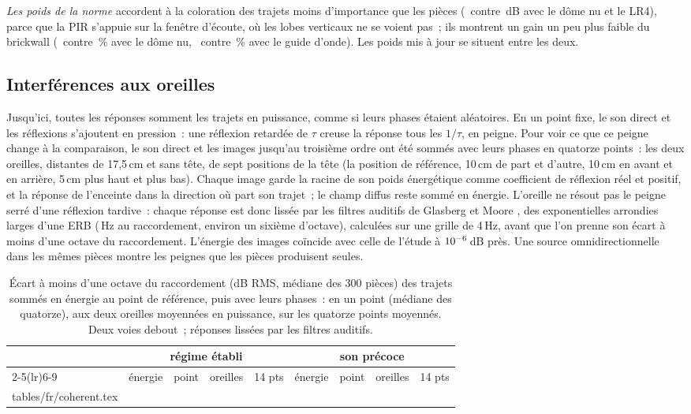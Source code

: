 \documentclass[11pt,a4paper]{article}
\makeatletter
\newcommand{\rows}[1]{\@@input tables/fr/#1.tex }
\makeatother
\begin{document}
\emph{Les poids de la norme} accordent à la coloration des trajets moins d'importance que les pièces
(\ncolDomeLrFourPir\ contre \ncolDomeLrFourSteady\,dB avec le dôme nu et le LR4), parce que la PIR
s'appuie sur la fenêtre d'écoute, où les lobes verticaux ne se voient pas~; ils montrent un gain un peu
plus faible du brickwall (\ncolDomeRedPir\ contre \ncolDomeRedSteady\,\% avec le dôme nu, \ncolWgRedPir\
contre \ncolWgRedSteady\,\% avec le guide d'onde). Les poids mis à jour se situent entre les deux.

\clearpage
\subsection{Interférences aux oreilles}
\label{sec:interference}

Jusqu'ici, toutes les réponses somment les trajets en puissance, comme si leurs phases étaient
aléatoires. En un
point fixe, le son direct et les réflexions s'ajoutent en pression~: une réflexion retardée de $\tau$
creuse la réponse tous les $1/\tau$, en peigne. Pour voir ce que ce peigne change à la comparaison, le
son direct et les images jusqu'au troisième ordre ont été sommés avec leurs phases en quatorze
points~: les deux oreilles, distantes de 17,5\,cm et sans tête, de sept positions de la tête (la
position de référence, 10\,cm de part et d'autre, 10\,cm en avant et en arrière, 5\,cm plus haut et plus
bas). Chaque image garde la racine de son poids énergétique comme coefficient de réflexion réel et
positif, et la réponse de l'enceinte dans la direction où part son trajet~; le champ diffus reste sommé
en énergie. L'oreille ne résout pas le peigne serré d'une réflexion tardive~: chaque réponse est donc
lissée par les filtres auditifs de Glasberg et Moore \cite{glasberg1990}, des exponentielles arrondies
larges d'une ERB (\nerbCrossover\,Hz au raccordement, environ un sixième d'octave), calculées sur une grille
de 4\,Hz, avant que l'on prenne son écart à moins d'une octave du raccordement. L'énergie des images
coïncide avec celle de l'étude à $10^{-6}$\,dB près. Une source omnidirectionnelle dans les mêmes pièces
montre les peignes que les pièces produisent seules.

\begin{table}[t]
\centering
\caption{Écart à moins d'une octave du raccordement (dB RMS, médiane des 300 pièces) des trajets sommés
en énergie au point de référence, puis avec leurs phases~: en un point (médiane des quatorze), aux deux
oreilles moyennées en puissance, sur les quatorze points moyennés. Deux voies debout~; réponses lissées
par les filtres auditifs.}
\label{tab:coherent}
\small
\begin{tabular}{lrrrrrrrr}
\toprule
& \multicolumn{4}{c}{régime établi} & \multicolumn{4}{c}{son précoce} \\
\cmidrule(lr){2-5}\cmidrule(lr){6-9}
& énergie & point & oreilles & 14 pts & énergie & point & oreilles & 14 pts \\
\midrule
\rows{coherent}
\bottomrule
\end{tabular}
\end{table}
\end{document}
